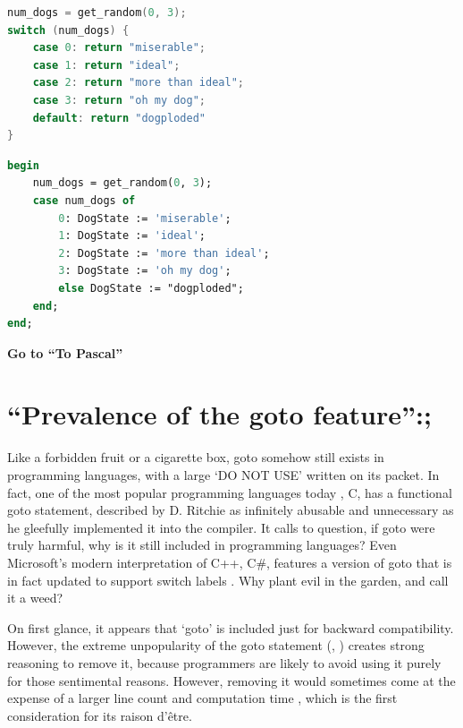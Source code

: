 \documentclass{journal}
\begin{document}
\begin{minipage}{\linewidth}
	\centering
\begin{minipage}[h]{0.45\linewidth}
	\centering
	\begin{lstlisting}[language=C, frame=single, mathescape,title={Switch (C)}]
num_dogs = get_random(0, 3);
switch (num_dogs) {
	case 0: return "miserable";
	case 1: return "ideal";
	case 2: return "more than ideal";
	case 3: return "oh my dog";
	default: return "dogploded"
}
	\end{lstlisting}
\end{minipage}
\hspace{0.03\linewidth}
\begin{minipage}[h]{0.45\linewidth}
	\centering
	\begin{lstlisting}[language=Pascal, frame=single, mathescape, title={Case (Pascal)}]
begin
	num_dogs = get_random(0, 3);
	case num_dogs of
		0: DogState := 'miserable';
		1: DogState := 'ideal';
		2: DogState := 'more than ideal';
		3: DogState := 'oh my dog';
		else DogState := "dogploded";
	end;
end;
	\end{lstlisting}
\end{minipage}
\hspace{0.03\linewidth}
\end{minipage}

\textbf{Go to ``To Pascal''}

\setcounter{section}{2}
\section{``Prevalence of the goto feature'':;}
Like a forbidden fruit or a cigarette box, goto somehow still exists in programming languages, with a large `DO NOT USE' written on its packet. In fact, one of the most popular programming languages today \cite{languagestudy}, C, has a functional goto statement, described by D. Ritchie as infinitely abusable and unnecessary \cite{cprogramming} as he gleefully implemented it into the compiler. It calls to question, if goto were truly harmful, why is it still included in programming languages? Even Microsoft's modern interpretation of C++, C\#, features a version of goto that is in fact updated to support switch labels \cite{csharp}. Why plant evil in the garden, and call it a weed?

On first glance, it appears that `goto' is included just for backward compatibility. However, the extreme unpopularity of the goto statement (\cite{goto}, \cite{againstgoto}) creates strong reasoning to remove it, because programmers are likely to avoid using it purely for those sentimental reasons. However, removing it would sometimes come at the expense of a larger line count and computation time \cite{structuredcapability, caseforgoto}, which is the first consideration for its raison d'être.
\end{document}
